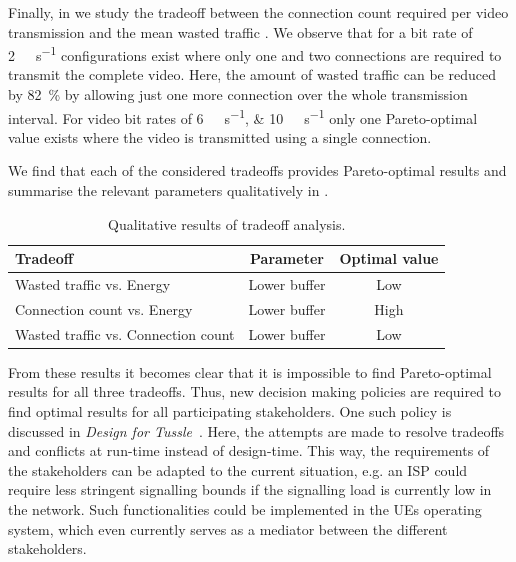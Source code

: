 Finally, in  we study the tradeoff between the connection count \connectioncount required per video transmission and the mean wasted traffic \meanwastedtraffic.
We observe that for a bit rate \bitrate of \SI{2}{\mega\bit\per\second} configurations exist where only one and two connections are required to transmit the complete video.
Here, the amount of wasted traffic can be reduced by \SI{82}{\percent} by allowing just one more connection over the whole transmission interval.
For video bit rates \bitrate of \SIlist{6;10}{\mega\bit\per\second} only one Pareto-optimal value exists where the video is transmitted using a single connection.

We find that each of the considered tradeoffs provides Pareto-optimal results and summarise the relevant parameters qualitatively in .
\begin{table}
  \centering
  \begin{tabular}{lcc}
    \toprule
  Tradeoff & Parameter & Optimal value\\
    \midrule
    Wasted traffic vs. Energy & Lower buffer & Low\\
    Connection count vs. Energy & Lower buffer & High\\
    Wasted traffic vs. Connection count & Lower buffer & Low\\
    \bottomrule
  \end{tabular}
  \caption{Qualitative results of tradeoff analysis.}
  \label{tab:application:lte_video:numerical_evaluation:trade_offs:summary}
\end{table}

From these results it becomes clear that it is impossible to find Pareto-optimal results for all three tradeoffs.
Thus, new decision making policies are required to find optimal results for all participating stakeholders.
One such policy is discussed in \emph{Design for Tussle}~\cite{trilogy2008,Clark2005}.
Here, the attempts are made to resolve tradeoffs and conflicts at run-time instead of design-time.
This way, the requirements of the stakeholders can be adapted to the current situation, e.g. an \gls{ISP} could require less stringent signalling bounds if the signalling load is currently low in the network.
Such functionalities could be implemented in the \glspl{UE} operating system, which even currently serves as a mediator between the different stakeholders.